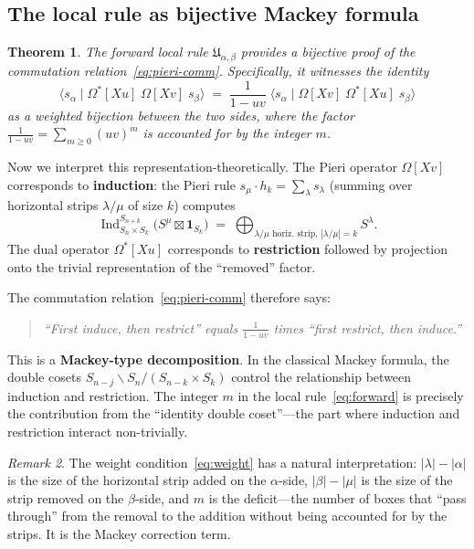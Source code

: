 \documentclass[12pt,a4paper]{article}
\newtheorem{theorem}{Theorem}[section]
\theoremstyle{definition}
\theoremstyle{remark}
\newtheorem{remark}[theorem]{Remark}
\newcommand{\fU}{\mathfrak{U}}
\newcommand{\Ind}{\operatorname{Ind}}
\begin{document}
\subsection{The local rule as bijective Mackey formula}

\begin{theorem}\label{thm:local-mackey}
The forward local rule $\fU_{\alpha,\beta}$ provides a bijective proof
of the commutation relation~\eqref{eq:pieri-comm}. Specifically, it
witnesses the identity
\[
  \langle s_\alpha \mid \Omega^*[Xu]\;\Omega[Xv]\; s_\beta \rangle
  \;=\;
  \frac{1}{1-uv}\;
  \langle s_\alpha \mid \Omega[Xv]\;\Omega^*[Xu]\; s_\beta \rangle
\]
as a weighted bijection between the two sides, where the factor
$\frac{1}{1-uv} = \sum_{m \geqslant 0} (uv)^m$ is accounted for by
the integer $m$.
\end{theorem}

Now we interpret this representation-theoretically. The Pieri operator
$\Omega[Xv]$ corresponds to \textbf{induction}: the Pieri rule
$s_\mu \cdot h_k = \sum_\lambda s_\lambda$ (summing over horizontal
strips $\lambda/\mu$ of size $k$) computes
\[
  \Ind_{S_n \times S_k}^{S_{n+k}}\bigl(S^\mu \boxtimes \mathbf{1}_{S_k}\bigr)
  \;=\; \bigoplus_{\lambda/\mu \text{ horiz.\ strip, } |\lambda/\mu|=k} S^\lambda.
\]
The dual operator $\Omega^*[Xu]$ corresponds to \textbf{restriction}
followed by projection onto the trivial representation of the
``removed'' factor.

The commutation relation~\eqref{eq:pieri-comm} therefore says:
\begin{quote}
\emph{``First induce, then restrict'' equals $\frac{1}{1-uv}$ times
``first restrict, then induce.''}
\end{quote}
This is a \textbf{Mackey-type decomposition}. In the classical Mackey
formula, the double cosets $S_{n-j} \backslash S_n / (S_{n-k} \times
S_k)$ control the relationship between induction and restriction.
The integer $m$ in the local rule~\eqref{eq:forward} is precisely the
contribution from the ``identity double coset''---the part where
induction and restriction interact non-trivially.

\begin{remark}
The weight condition~\eqref{eq:weight} has a natural interpretation:
$|\lambda| - |\alpha|$ is the size of the horizontal strip added on
the $\alpha$-side, $|\beta| - |\mu|$ is the size of the strip removed
on the $\beta$-side, and $m$ is the deficit---the number of boxes that
``pass through'' from the removal to the addition without being
accounted for by the strips. It is the Mackey correction term.
\end{remark}
\end{document}
